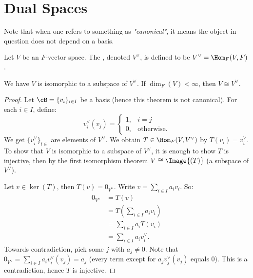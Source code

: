 \section{Dual Spaces}
    Note that when one refers to something as \textit{"canonical"}, it means the object in question does not depend on a basis.
    \begin{definition}
        Let $V$ be an $F$-vector space. The , denoted $V^\vee$, is defined to be $V^\vee = \Hom_F{(V,F)}$.
    \end{definition}

    \begin{theorem}
        We have $V$ is isomorphic to a subspace of $V^\vee$. If $\dim_F{(V)} < \infty$, then $V \cong V^\vee$.
    \end{theorem}
        \begin{proof}
            Let $\cB = \{v_i\}_{i \in I}$ be a basis (hence this theorem is not canonical). For each $i \in I$, define:
                \begin{equation*}
                    v_i^\vee (v_j) =
                \begin{cases}
                    1,& i=j \\
                    0,&\text{otherwise}.
                \end{cases}
                \end{equation*}
            We get $\{v_i ^\vee\}_{i \in}$ are elements of $V^\vee$. We obtain $T \in \Hom_F{(V,V^\vee)}$ by $T(v_i) = v_i^\vee$. To show that $V$ is isomorphic to a subspace of $V^\vee$, it is enough to show $T$ is injective, then by the first isomorphism theorem $V \cong \Image{(T)}$ (a subspace of $V^\vee$).

            Let $v \in \ker{(T)}$, then $T(v) = 0_{V^\vee}$. Write $v = \sum_{i \in I}a_i v_i$. So:
                \begin{equation*}
                \begin{split}
                    0_{V^\vee}
                    & = T(v) \\
                    & = T\left(\sum_{i \in I}a_i v_i\right) \\
                    & = \sum_{i \in I}a_i T(v_i) \\
                    & = \sum_{i \in I}a_i v_i^\vee.
                \end{split}
                \end{equation*}
            Towards contradiction, pick some $j$ with $a_j \neq 0$. Note that $0_{V^\vee} = \sum_{i \in I}a_i v_i^\vee(v_j) = a_j$ (every term except for $a_jv_j ^\vee (v_j)$ equals 0). This is a contradiction, hence $T$ is injective. 


\end{proof}
